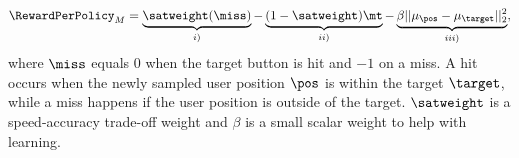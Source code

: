 \begin{equation}
    \RewardPerPolicy_M = \underbrace{\satweight (\miss)}_{i)} - \underbrace{(1-\satweight) \mt}_{ii)} - \underbrace{\beta ||\mu_{\pos} - \mu_\target||_2^2}_{iii)},
\end{equation}
where $\miss$ equals $0$ when the target button is hit and $-1$ on a miss. A hit occurs when the newly sampled user position $\pos$ is within the target $\target$, while a miss happens if the user position is outside of the target. $\satweight$ is a speed-accuracy trade-off weight and $\beta$ is a small scalar weight to help with learning.




